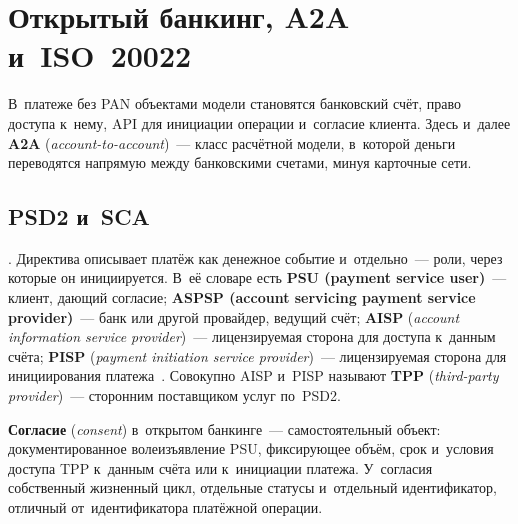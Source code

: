 \chapter{Открытый банкинг, A2A и~ISO~20022}\label{ch:open-banking}
В~платеже без PAN объектами модели становятся банковский счёт, право доступа
к~нему, API для инициации операции и~согласие клиента. Здесь и~далее \textbf{A2A}
(\textit{account-to-account})~--- класс расчётной модели, в~которой деньги
переводятся напрямую между банковскими счетами, минуя карточные сети.

\section{PSD2 и~SCA}\label{sec:psd2-sca}


. Директива описывает платёж как денежное событие и~отдельно~--- роли,
через которые он инициируется. В~её словаре есть
\textbf{PSU (payment service user)}~--- клиент, дающий согласие; \textbf{ASPSP
(account servicing payment service provider)}~--- банк или другой провайдер,
ведущий счёт; \textbf{AISP} (\textit{account information service provider})~---
лицензируемая сторона для доступа к~данным счёта; \textbf{PISP} (\textit{payment
initiation service provider})~--- лицензируемая сторона для инициирования
платежа~\cite{psd2}. Совокупно AISP и~PISP называют \textbf{TPP}
(\textit{third-party provider})~--- сторонним поставщиком услуг по~PSD2.

\textbf{Согласие} (\textit{consent}) в~открытом банкинге~--- самостоятельный
объект: документированное волеизъявление PSU, фиксирующее объём, срок и~условия
доступа TPP к~данным счёта или к~инициации платежа. У~согласия собственный
жизненный цикл, отдельные статусы и~отдельный идентификатор, отличный
от~идентификатора платёжной операции.

